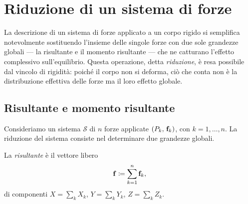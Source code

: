 \section{Riduzione di un sistema di forze}

La descrizione di un sistema di forze applicato a un corpo
rigido si semplifica notevolmente sostituendo l'insieme delle
singole forze con due sole grandezze globali --- la risultante
e il momento risultante --- che ne catturano l'effetto
complessivo sull'equilibrio. Questa operazione, detta
\textit{riduzione}, è resa possibile dal vincolo di rigidità:
poiché il corpo non si deforma, ciò che conta non è la
distribuzione effettiva delle forze ma il loro effetto globale.

\subsection{Risultante e momento risultante}

Consideriamo un sistema $\mathcal{S}$ di $n$ forze applicate
$(P_k,\,\mathbf{f}_k)$, con $k=1,\dots,n$. La riduzione del sistema
consiste nel determinare due grandezze globali.

La \textit{risultante} è il vettore libero
\begin{equation}\label{eq:risultante}
	\mathbf{f} \coloneqq \sum_{k=1}^{n} \mathbf{f}_k,
\end{equation}
di componenti $X = \sum_k X_k$, $Y = \sum_k Y_k$,
$Z = \sum_k Z_k$.

